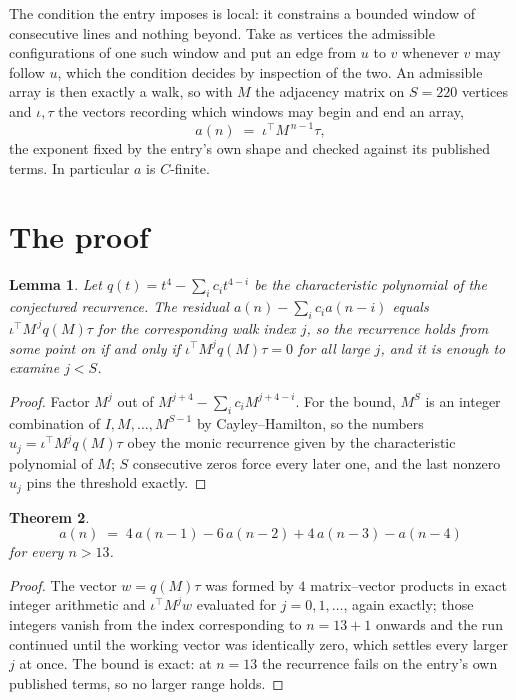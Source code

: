 \documentclass[11pt,a4paper]{article}
\theoremstyle{plain}
\newtheorem{theorem}{Theorem}
\newtheorem{lemma}[theorem]{Lemma}
\theoremstyle{definition}
\begin{document}
The condition the entry imposes is local: it constrains a bounded window of consecutive lines and nothing beyond. Take as
vertices the admissible configurations of one such window and put an edge from $u$ to $v$
whenever $v$ may follow $u$, which the condition decides by inspection of the two. An
admissible array is then exactly a walk, so with $M$ the adjacency matrix on $S=220$ vertices
and $\iota,\tau$ the vectors recording which windows may begin and end an array,
\[
a(n)\;=\;\iota^{\!\top}M^{\,n-1}\tau ,
\]
the exponent fixed by the entry's own shape and checked against its published terms. In
particular $a$ is $C$-finite.

\section{The proof}

\begin{lemma}\label{lem:crit}
Let $q(t)=t^{4}-\sum_i c_it^{4-i}$ be the characteristic polynomial of the
conjectured recurrence. The residual $a(n)-\sum_ic_ia(n-i)$ equals
$\iota^{\!\top}M^{\,j}q(M)\tau$ for the corresponding walk index $j$, so the recurrence
holds from some point on if and only if $\iota^{\!\top}M^{j}q(M)\tau=0$ for all large $j$,
and it is enough to examine $j<S$.
\end{lemma}

\begin{proof}
Factor $M^{j}$ out of $M^{j+4}-\sum_ic_iM^{j+4-i}$. For the bound, $M^{S}$
is an integer combination of $I,M,\dots,M^{S-1}$ by Cayley--Hamilton, so the numbers
$u_j=\iota^{\!\top}M^{j}q(M)\tau$ obey the monic recurrence given by the characteristic
polynomial of $M$; $S$ consecutive zeros force every later one, and the last nonzero $u_j$
pins the threshold exactly.
\end{proof}

\begin{theorem}
\[
a(n)\;=\;4\,a(n-1) - 6\,a(n-2) + 4\,a(n-3) - a(n-4)
\]
for every $n>13$.
\end{theorem}

\begin{proof}
The vector $w=q(M)\tau$ was formed by $4$ matrix--vector products in exact integer
arithmetic and $\iota^{\!\top}M^{j}w$ evaluated for $j=0,1,\dots$, again exactly; those
integers vanish from the index corresponding to $n=13+1$ onwards and the run continued
until the working vector was identically zero, which settles every larger $j$ at once. The bound is exact: at $n=13$ the recurrence fails on the entry's own published terms, so no larger range holds.
\end{proof}
\end{document}
